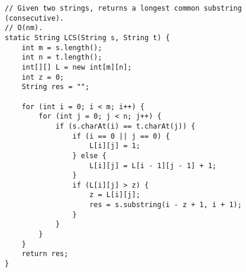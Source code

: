 \begin{verbatim}
// Given two strings, returns a longest common substring (consecutive).
// O(nm).
static String LCS(String s, String t) {
	int m = s.length();
	int n = t.length();
	int[][] L = new int[m][n];
	int z = 0;
	String res = "";

	for (int i = 0; i < m; i++) {
		for (int j = 0; j < n; j++) {
			if (s.charAt(i) == t.charAt(j)) {
				if (i == 0 || j == 0) {
					L[i][j] = 1;
				} else {
					L[i][j] = L[i - 1][j - 1] + 1;
				}
				if (L[i][j] > z) {
					z = L[i][j];
					res = s.substring(i - z + 1, i + 1);
				}
			}
		}
	}
	return res;
}
\end{verbatim}